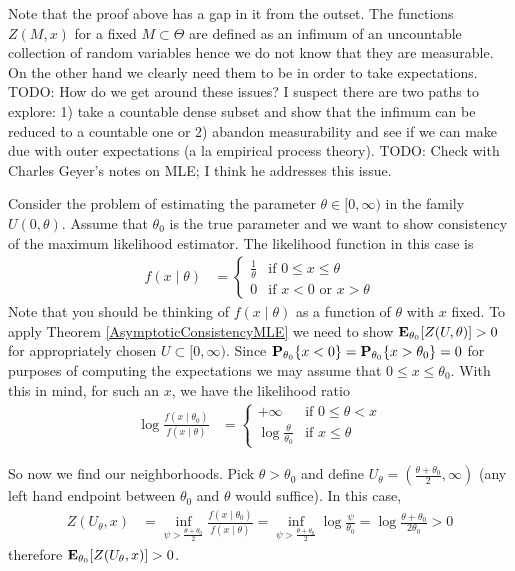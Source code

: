 Note that the proof above has a gap in it from the outset.  The
functions $Z(M, x)$ for a fixed $M \subset \Theta$ are defined as an
infimum of an uncountable collection of random variables hence we do
not know that they are measurable.  On the other hand we clearly need
them to be in order to take expectations.  TODO:  How do we get around
these issues?  I suspect there are two paths to explore: 1) take a
countable dense subset and show that the infimum can be reduced to a
countable one or 2) abandon measurability and see if we can make due
with outer expectations (a la empirical process theory).  TODO: Check
with Charles Geyer's notes on MLE; I think he addresses this issue.

\begin{examp}
Consider the problem of estimating the parameter $\theta \in [0,
\infty)$ in the family $U(0, \theta)$.  Assume that $\theta_0$ is the
true parameter and we want to show consistency of the maximum
likelihood estimator.  The likelihood function in
this case is 
\begin{align*}
f(x \mid \theta) &= \begin{cases}
\frac{1}{\theta} & \text{if $0 \leq x \leq \theta$} \\
0 & \text{if $x < 0$ or $x > \theta$}
\end{cases}
\end{align*}
Note that you should be thinking of $f(x \mid \theta)$ as a function
of $\theta$ with $x$ fixed.  To apply Theorem
\ref{AsymptoticConsistencyMLE}
we need to show $\sexpectation{Z(U, \theta)}{\theta_0} > 0$ for
appropriately chosen $U \subset [0, \infty)$.  Since $\sprobability{x <
  0}{\theta_0} = \sprobability{x > \theta_0}{\theta_0} = 0$ for
purposes of computing the expectations we may assume that $0 \leq x
\leq \theta_0$.  With this in mind, for such an $x$, we have the likelihood ratio
\begin{align*}
\log \frac{f(x \mid \theta_0)}{f (x \mid \theta)} &= \begin{cases}
+\infty & \text{if $0 \leq \theta < x$} \\
\log \frac{\theta}{\theta_0} & \text{if $x \leq \theta$} 
\end{cases}
\end{align*}

So now we find our neighborhoods.  Pick $\theta > \theta_0$ and define
$U_\theta = (\frac{\theta + \theta_0}{2}, \infty)$ (any left hand
endpoint between $\theta_0$ and $\theta$ would suffice).  In this
case,
\begin{align*}
Z(U_\theta, x) &= \inf_{\psi > \frac{\theta + \theta_0}{2}} \frac{f(x
  \mid \theta_0)}{f(x \mid \theta)} = 
\inf_{\psi > \frac{\theta +    \theta_0}{2}} \log \frac{\psi}{\theta_0} =
\log \frac{\theta + \theta_0}{2 \theta_0} > 0
\end{align*}
therefore $\sexpectation{Z(U_\theta, x)}{\theta_0} > 0$.


\end{examp}
